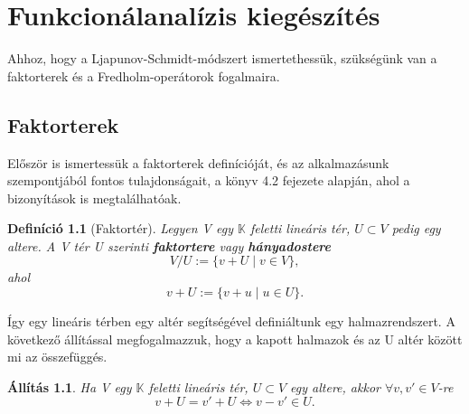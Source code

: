 \documentclass[oneside, titlepage, 12pt, a4paper]{report}
\newtheorem{definition}{Definíció}[section]
\newtheorem{statement}{Állítás}[section]
\begin{document}


\onehalfspacing
\chapter{Funkcionálanalízis kiegészítés}	%
\label{chap:Funcanal_ext}

Ahhoz, hogy a Ljapunov-Schmidt-módszert ismertethessük, szükségünk van a faktorterek és a Fredholm-operátorok fogalmaira.


\section{Faktorterek}
\label{sec:Faktorter}

Először is ismertessük a faktorterek definícióját, és az alkalmazásunk szempontjából fontos tulajdonságait, a \cite{faktorter} könyv 4.2 fejezete alapján, ahol a bizonyítások is megtalálhatóak.
\begin{definition}[Faktortér]
Legyen V egy $\mathbb{K}$ feletti lineáris tér, $U \subset V$ pedig egy altere. A V tér U szerinti \textbf{faktortere} vagy \textbf{hányadostere}
\begin{equation}
V / U := \{v + U \mid v \in V\},
\end{equation}
ahol
\begin{equation}
v + U := \{v + u \mid u \in U \}.
\end{equation}
\end{definition}

Így egy lineáris térben egy altér segítségével definiáltunk egy halmazrendszert. A következő állítással megfogalmazzuk, hogy a kapott halmazok és az U altér között mi az összefüggés.
\begin{statement}
Ha V egy $\mathbb{K}$ feletti lineáris tér, $U \subset V$ egy altere, akkor $\forall v, v' \in V$-re
\begin{equation}
v + U = v' + U \Leftrightarrow v - v' \in U.
\end{equation}
\end{statement}
\end{document}
